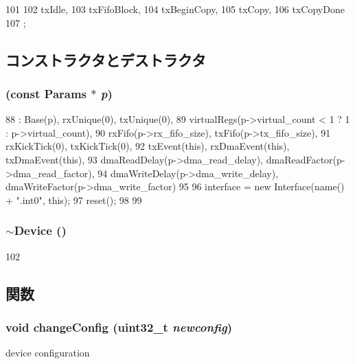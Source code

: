 \begin{DoxyCode}
101                  {
102         txIdle,
103         txFifoBlock,
104         txBeginCopy,
105         txCopy,
106         txCopyDone
107     };
\end{DoxyCode}


\subsection{コンストラクタとデストラクタ}
\hypertarget{classSinic_1_1Device_a3e931e68104ea04933647b3c2e08097b}{
\subsubsection[{Device}]{ (const {\bf Params} $\ast$ {\em p})}}
\label{classSinic_1_1Device_a3e931e68104ea04933647b3c2e08097b}



\begin{DoxyCode}
88     : Base(p), rxUnique(0), txUnique(0),
89       virtualRegs(p->virtual_count < 1 ? 1 : p->virtual_count),
90       rxFifo(p->rx_fifo_size), txFifo(p->tx_fifo_size),
91       rxKickTick(0), txKickTick(0),
92       txEvent(this), rxDmaEvent(this), txDmaEvent(this),
93       dmaReadDelay(p->dma_read_delay), dmaReadFactor(p->dma_read_factor),
94       dmaWriteDelay(p->dma_write_delay), dmaWriteFactor(p->dma_write_factor)
95 {
96     interface = new Interface(name() + ".int0", this);
97     reset();
98 
99 }
\end{DoxyCode}
\hypertarget{classSinic_1_1Device_a3b1601f6f775f47420713f755d1ef320}{
\subsubsection[{$\sim$Device}]{\setlength{\rightskip}{0pt plus 5cm}$\sim${\bf Device} ()}}
\label{classSinic_1_1Device_a3b1601f6f775f47420713f755d1ef320}



\begin{DoxyCode}
102 {}
\end{DoxyCode}


\subsection{関数}
\hypertarget{classSinic_1_1Device_abac0082da5c2420162cd3d183fab4f1f}{
\subsubsection[{changeConfig}]{\setlength{\rightskip}{0pt plus 5cm}void changeConfig ({\bf uint32\_\-t} {\em newconfig})}}
\label{classSinic_1_1Device_abac0082da5c2420162cd3d183fab4f1f}
device configuration 


